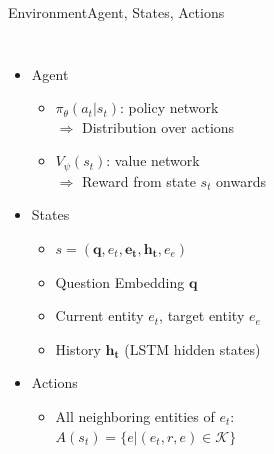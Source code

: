 \documentclass[table]{beamer}
\begin{document}
\begin{frame}{Environment}{Agent, States, Actions}
  \begin{columns}[T]
  \begin{itemize}
    \item Agent
    \begin{itemize}
      \item $\pi_\theta(a_t | s_t)$: policy network\\
       $\Rightarrow$ Distribution over actions
      \item $V_\psi(s_t)$: value network \\
      $\Rightarrow$ Reward from state $s_t$ onwards
    \end{itemize}
    \item<2-> States
    \begin{itemize}
      \item $s = (\mathbf{q}, e_t, \mathbf{e_t}, \mathbf{h_t}, e_e)$
      \item Question Embedding $\mathbf{q}$
      \item Current entity $e_t$, target entity $e_e$
      \item History $\mathbf{h_t}$ (LSTM hidden states)
    \end{itemize}
    \item<3-> Actions
    \begin{itemize}
      \item All neighboring entities of $e_t$:\\
      $A(s_t) = \{e | (e_t, r, e) \in \mathcal{K}\}$
    \end{itemize}
  \end{itemize}
  \begin{figure}
    \centering
  \hspace*{-0.5cm}

\end{figure}
\end{columns}
\end{frame}
\end{document}
